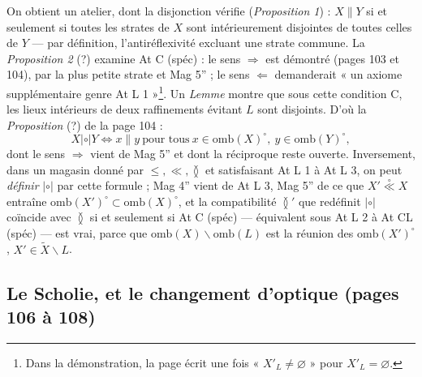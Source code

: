 \documentclass[11pt,a4paper]{article}
\begin{document}
On obtient un atelier, dont la disjonction vérifie (\emph{Proposition 1}) : $X
\parallel Y$ si et seulement si toutes les strates de $X$ sont intérieurement
disjointes de toutes celles de $Y$ --- par définition, l'antiréflexivité excluant
une strate commune. La \emph{Proposition 2} (?) examine At C (spéc) : le sens
$\Rightarrow$ est démontré (pages 103 et 104), par la plus petite strate et Mag
5'' ; le sens $\Leftarrow$ demanderait « un axiome supplémentaire genre At L 1 »\footnote{Dans
la démonstration, la page écrit une fois « $X'_{L} \neq \varnothing$ » pour
$X'_{L} = \varnothing$.}. Un \emph{Lemme} montre que sous cette condition C, les
lieux intérieurs de deux raffinements évitant $L$ sont disjoints. D'où la
\emph{Proposition} (?) de la page 104 :
\[
X \mathrel{|{\circ}|} Y \iff x \parallel y \ \text{pour tous}\ x \in
\mathrm{omb}(X)^{\circ},\ y \in \mathrm{omb}(Y)^{\circ} ,
\]
dont le sens $\Rightarrow$ vient de Mag 5'' et dont la réciproque reste ouverte.
Inversement, dans un magasin donné par $\leq, \ll, \between$ et satisfaisant At L 1 à
At L 3, on peut \emph{définir} $\mathrel{|{\circ}|}$ par cette formule ; Mag 4''
vient de At L 3, Mag 5'' de ce que $X' \mathrel{\overset{\circ}{\ll}} X$ entraîne
$\mathrm{omb}(X')^{\circ} \subset \mathrm{omb}(X)^{\circ}$, et la compatibilité
$\between'$ que redéfinit $\mathrel{|{\circ}|}$ coïncide avec $\between$ si et
seulement si At C (spéc) --- équivalent sous At L 2 à At CL (spéc) --- est vrai,
parce que $\mathrm{omb}(X) \smallsetminus \mathrm{omb}(L)$ est la réunion des
$\mathrm{omb}(X')^{\circ}$, $X' \in \widetilde{X} \smallsetminus L$.

\subsection*{Le Scholie, et le changement d'optique (pages 106 à 108)}
\end{document}
